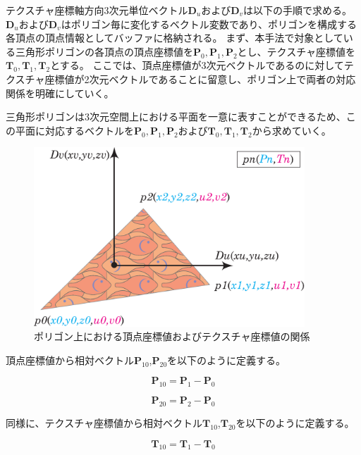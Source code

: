 テクスチャ座標軸方向3次元単位ベクトル$\bm{D}_u$および$\bm{D}_v$は以下の手順で求める。
$\bm{D}_u$および$\bm{D}_v$はポリゴン毎に変化するベクトル変数であり、ポリゴンを構成する各頂点の頂点情報としてバッファに格納される。
まず、本手法で対象としている三角形ポリゴンの各頂点の頂点座標値を$\bm{P}_0,\bm{P}_1,\bm{P}_2$とし、テクスチャ座標値を$\bm{T}_0,\bm{T}_1,\bm{T}_2$とする。
ここでは、頂点座標値が3次元ベクトルであるのに対してテクスチャ座標値が2次元ベクトルであることに留意し、ポリゴン上で両者の対応関係を明確にしていく。

三角形ポリゴンは3次元空間上における平面を一意に表すことができるため、この平面に対応するベクトルを$\bm{P}_0,\bm{P}_1,\bm{P}_2$および$\bm{T}_0,\bm{T}_1,\bm{T}_2$から求めていく。

\begin{figure}[h]
  \centering
  \includegraphics[width=4.0in]{./img/polygon_explain.eps}
  \caption{ポリゴン上における頂点座標値およびテクスチャ座標値の関係}
  \label{FVertexandtexture}
\end{figure}

\noindent
頂点座標値から相対ベクトル$\bm{P}_{10}$,$\bm{P}_{20}$を以下のように定義する。

\begin{equation}
\bm{P}_{10} = \bm{P}_1 - \bm{P}_0
\label{EP10}
\end{equation}

\begin{equation}
\bm{P}_{20} = \bm{P}_2 - \bm{P}_0
\label{EP20}
\end{equation}

\noindent
同様に、テクスチャ座標値から相対ベクトル$\bm{T}_{10}$,$\bm{T}_{20}$を以下のように定義する。

\begin{equation}
\bm{T}_{10} = \bm{T}_1 - \bm{T}_0
\label{ET10}
\end{equation}

